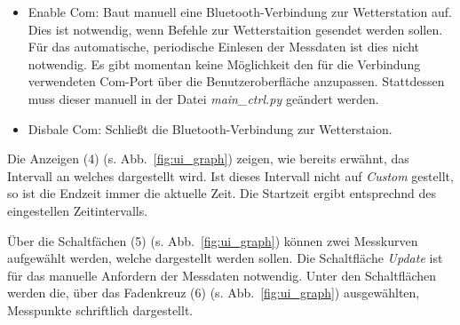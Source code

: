 \begin{itemize}
\begin{itemize}
  \item Enable Com: Baut manuell eine Bluetooth-Verbindung zur Wetterstation auf. Dies ist notwendig, wenn Befehle zur Wetterstaition gesendet werden sollen. Für das automatische, periodische Einlesen der Messdaten ist dies nicht notwendig. Es gibt momentan keine Möglichkeit den für die Verbindung verwendeten Com-Port über die Benutzeroberfläche anzupassen. Stattdessen muss dieser manuell in der Datei \emph{main\_ctrl.py} geändert werden.
  \item Disbale Com: Schließt die Bluetooth-Verbindung zur Wetterstaion.
  \end{itemize}
\end{itemize}

Die Anzeigen (4) (s. Abb.~\ref{fig:ui_graph}) zeigen, wie bereits erwähnt, das Intervall an welches dargestellt wird. Ist dieses Intervall nicht auf \emph{Custom} gestellt, so ist die Endzeit immer die aktuelle Zeit. Die Startzeit ergibt entsprechnd des eingestellen Zeitintervalls.

Über die Schaltfächen (5) (s. Abb.~\ref{fig:ui_graph}) können zwei Messkurven aufgewählt werden, welche dargestellt werden sollen. Die Schaltfläche \emph{Update} ist für das manuelle Anfordern der Messdaten notwendig. Unter den Schaltflächen werden die, über das Fadenkreuz (6) (s. Abb.~\ref{fig:ui_graph}) ausgewählten, Messpunkte schriftlich dargestellt.

